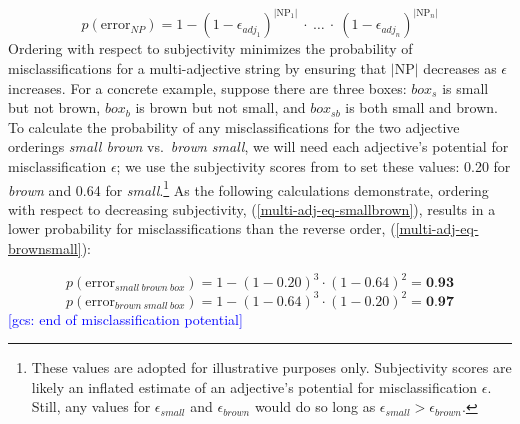 \documentclass[preprint,authoryear]{elsarticle}\frenchspacing
\newcommand{\gcs}[1]{\textcolor{blue}{[gcs: #1]}}
\begin{document}
\begin{equation} \label{multi-adj-eq}
p(\textrm{error}_{N\!P}) = 1 - (1-\epsilon_{adj_1})^{|\textrm{NP}_1|}\ \cdot\ \ldots\ \cdot\ (1-\epsilon_{adj_n})^{|\textrm{NP}_n|}
\end{equation}
Ordering with respect to subjectivity minimizes the probability of misclassifications for a multi-adjective string by ensuring that $|\textrm{NP}|$ decreases as $\epsilon$ increases. For a concrete example, suppose there are three boxes: $box_{s}$ is small but not brown, $box_{b}$ is brown but not small, and $box_{sb}$ is both small and brown. To calculate the probability of any misclassifications for the two adjective orderings \emph{small brown} vs.~\emph{brown small}, we will need each adjective's potential for misclassification $\epsilon$; we use the subjectivity scores from \cite{scontrasetal2017adjectives} to set these values: 0.20 for \emph{brown} and 0.64 for \emph{small}.\footnote{These values are adopted for illustrative purposes only. Subjectivity scores are likely an inflated estimate of an adjective's potential for misclassification $\epsilon$. Still, any values for $\epsilon_{small}$ and $\epsilon_{brown}$ would do so long as $\epsilon_{small} > \epsilon_{brown}$.} As the following calculations demonstrate, ordering with respect to decreasing subjectivity, (\ref{multi-adj-eq-smallbrown}), results in a lower probability for misclassifications than the reverse order, (\ref{multi-adj-eq-brownsmall}):

\begin{equation} \label{multi-adj-eq-smallbrown}
p(\textrm{error}_{small\ brown\ box}) = 1 - (1-0.20)^{3} \cdot (1-0.64)^{2} = \textbf{0.93}
\end{equation}
\begin{equation} \label{multi-adj-eq-brownsmall}
p(\textrm{error}_{brown\ small\ box}) = 1 - (1-0.64)^{3} \cdot (1-0.20)^{2} = \textbf{0.97}
\end{equation}
\gcs{end of misclassification potential}
\end{document}
